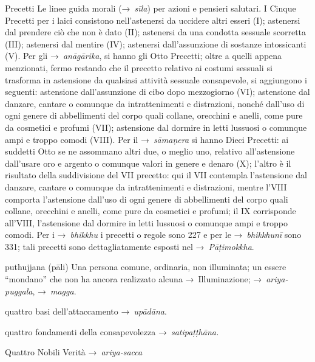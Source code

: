 \begin{glossarydescription}
\item[Precetti] \label{glossary-precetti} Le linee guida morali (→~\emph{sīla}) per azioni e pensieri
  salutari. I Cinque Precetti per i laici consistono nell'astenersi da uccidere
  altri esseri (I); astenersi dal prendere ciò che non è dato (II); astenersi da
  una condotta sessuale scorretta (III); astenersi dal mentire (IV); astenersi
  dall'assunzione di sostanze intossicanti (V). Per gli →~\emph{anāgārika}, si
  hanno gli Otto Precetti; oltre a quelli appena menzionati, fermo restando che
  il precetto relativo ai costumi sessuali si trasforma in astensione da
  qualsiasi attività sessuale consapevole, si aggiungono i seguenti: astensione
  dall'assunzione di cibo dopo mezzogiorno (VI); astensione dal danzare, cantare
  o comunque da intrattenimenti e distrazioni, nonché dall'uso di ogni genere di
  abbellimenti del corpo quali collane, orecchini e anelli, come pure da
  cosmetici e profumi (VII); astensione dal dormire in letti lussuosi o comunque
  ampi e troppo comodi (VIII). Per il →~\emph{sāmaṇera} si hanno Dieci Precetti:
  ai suddetti Otto se ne assommano altri due, o meglio uno, relativo
  all'astensione dall'usare oro e argento o comunque valori in genere e denaro
  (X); l'altro è il risultato della suddivisione del VII precetto: qui il VII
  contempla l'astensione dal danzare, cantare o comunque da intrattenimenti e
  distrazioni, mentre l'VIII comporta l'astensione dall'uso di ogni genere di
  abbellimenti del corpo quali collane, orecchini e anelli, come pure da
  cosmetici e profumi; il IX corrisponde all'VIII, l'astensione dal dormire in
  letti lussuosi o comunque ampi e troppo comodi. Per i →~\emph{bhikkhu} i
  precetti o regole sono 227 e per le →~\emph{bhikkhunī} sono 331; tali precetti
  sono dettagliatamente esposti nel →~\emph{Pāṭimokkha}.

\item[puthujjana] (pāli) Una persona comune, ordinaria, non illuminata; un
  essere ``mondano'' che non ha ancora realizzato alcuna →~Illuminazione;
  →~\emph{ariya-puggala}, →~\emph{magga}.


\item[quattro basi dell'attaccamento] →~\emph{upādāna}.

\item[quattro fondamenti della consapevolezza] →~\emph{satipaṭṭhāna.}

\item[Quattro Nobili Verità] →~\emph{ariya-sacca}


\end{glossarydescription}
